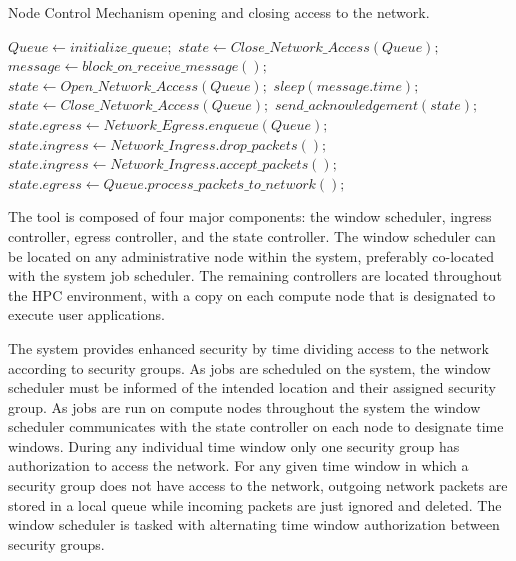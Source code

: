 \documentclass{llncs}
\begin{document}
\begin{algorithm}
	\caption{Node Control Mechanism opening and closing access to the network.}
	\label{alg:node_controller}
	\begin{algorithmic}[1]
		\Statex
			\State $Queue \gets initialize\_queue;$
				\State $state \gets Close\_Network\_Access(Queue);$
					\State $message \gets block\_on\_receive\_message();$
				\EndWhile
				\State $state \gets Open\_Network\_Access(Queue);$
				\State $sleep(message.time);$
				\State $state \gets Close\_Network\_Access(Queue);$
				\State $send\_acknowledgement(state);$
			\EndWhile
		\EndFunction
		\Statex
			\State $state.egress \gets Network\_Egress.enqueue(Queue);$
			\State $state.ingress \gets Network\_Ingress.drop\_packets();$
			\State {}
		\EndFunction
		\Statex
			\State $state.ingress \gets Network\_Ingress.accept\_packets();$
			\State $state.egress \gets Queue.process\_packets\_to\_network();$
			\State {}
		\EndFunction
	\end{algorithmic}
\end{algorithm}	
		
The tool is composed of four major components:  the window scheduler, ingress controller, egress controller, and the state controller. The window scheduler can be located on any administrative node within the system, preferably co-located with the system job scheduler. The remaining controllers are located throughout the HPC environment, with a copy on each compute node that is designated to execute user applications. 

The system provides enhanced security by time dividing access to the network according to security groups. As jobs are scheduled on the system, the window scheduler must be informed of the intended location and their assigned security group. As jobs are run on compute nodes throughout the system the window scheduler communicates with the state controller on each node to designate time windows. During any individual time window only one security group has authorization to access the network. For any given time window in which a security group does not have access to the network, outgoing network packets are stored in a local queue while incoming packets are just ignored and deleted. The window scheduler is tasked with alternating time window authorization between security groups.
\end{document}
